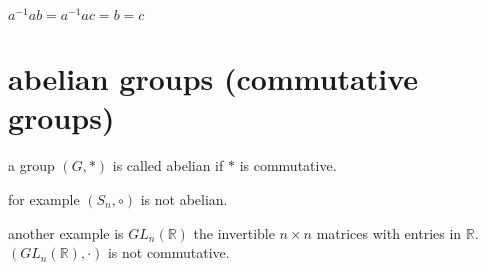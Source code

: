 \documentclass[letterpaper]{article}
\begin{document}
$a^{-1}ab=a^{-1}ac=b=c$

\section*{abelian groups (commutative groups)}
a group $(G,*)$ is called abelian if $*$ is commutative.

for example $(S_n,\circ)$ is not abelian.

another example is $GL_n(\mathbb{R})$ the invertible $n\times n$ matrices with entries in $\mathbb{R}$. $(GL_n(\mathbb{R}),\cdot)$ is not commutative.
\end{document}

